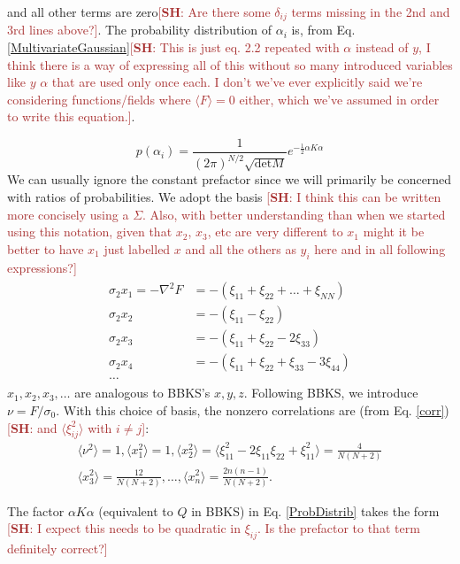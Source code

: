 \documentclass[12pt]{article}
\newcommand{\SH}[1]{\textcolor{brown}{[{\bf SH}: #1]}}
\begin{document}
\noindent and all other terms are zero\SH{Are there some $\delta_{ij}$ terms missing in the 2nd and 3rd lines above?}. The probability distribution of $\alpha_i$ is, from Eq. \ref{MultivariateGaussian}\SH{This is just eq. 2.2 repeated with $\alpha$ instead of $y$, I think there is a way of expressing all of this without so many introduced variables like $y$ $\alpha$ that are used only once each. I don't we've ever explicitly said we're considering functions/fields where $\langle F\rangle=0$ either, which we've assumed in order to write this equation.}.

\begin{equation} \label{ProbDistrib}
p(\alpha_i)=\frac{1}{(2\pi)^{N/2}\sqrt{\mathrm{det}M}} e^{-\frac{1}{2}\alpha K \alpha}
\end{equation}
%
We can usually ignore the constant prefactor since we will primarily be concerned with ratios of probabilities.  We adopt the basis \SH{I think this can be written more concisely using a $\Sigma$. Also, with better understanding than when we started using this notation, given that $x_2$, $x_3$, etc are very different to $x_1$ might it be better to have $x_1$ just labelled $x$ and all the others as $y_i$ here and in all following expressions?}
%
\begin{align}
\begin{split}
\label{BasisTransform}
\sigma_2x_1 = -\nabla^2F &= -(\xi_{11}+\xi_{22}+\ldots+\xi_{NN})\\
\sigma_2x_2 &= -(\xi_{11}-\xi_{22})\\
\sigma_2x_3 &= -(\xi_{11}+\xi_{22}-2\xi_{33})\\
\sigma_2x_4 &= -(\xi_{11}+\xi_{22}+\xi_{33}-3\xi_{44})\\
\ldots
\end{split}
\end{align}
%
$x_1, x_2, x_3, \ldots$ are analogous to BBKS's $x, y, z$. Following BBKS, we introduce $\nu = F/\sigma_0$. With this choice of basis, the nonzero correlations are (from Eq. \ref{corr}) \SH{and $\langle\xi_{ij}^2\rangle$ with $i\neq j$}:
%
\begin{gather}
\langle\nu^2\rangle = 1, \langle x_1^2\rangle=1, \langle x_2^2 \rangle = \langle \xi_{11}^2 -2\xi_{11}\xi_{22} + \xi_{11}^2\rangle = \frac{4}{N(N+2)} \\
\langle x_3^2 \rangle = \frac{12}{N(N+2)}, \ldots, \langle x_n^2 \rangle = \frac{2n(n-1)}{N(N+2)}.
\end{gather}

The factor $\alpha K \alpha$ (equivalent to $Q$ in BBKS) in Eq. \ref{ProbDistrib} takes the form \SH{I expect this needs to be quadratic in $\xi_{ij}$. Is the prefactor to that term definitely correct?}
\end{document}
